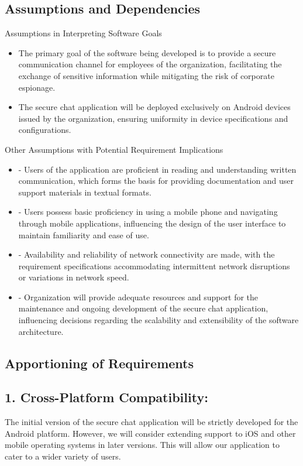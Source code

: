 \documentclass[]{article}
\begin{document}
\subsection{Assumptions and Dependencies}
\label{sub:assumptions_and_dependencies}
Assumptions in Interpreting Software Goals
\begin{itemize}
	\item The primary goal of the software being developed is to provide a secure communication channel for employees of the organization, facilitating the exchange of sensitive information while mitigating the risk of corporate espionage.
	\item The secure chat application will be deployed exclusively on Android devices issued by the organization, ensuring uniformity in device specifications and configurations.
\end{itemize}
Other Assumptions with Potential Requirement Implications
\begin{itemize}
	\item -	Users of the application are proficient in reading and understanding written communication, which forms the basis for providing documentation and user support materials in textual formats.
	\item -	Users possess basic proficiency in using a mobile phone and navigating through mobile applications, influencing the design of the user interface to maintain familiarity and ease of use.
	\item -	Availability and reliability of network connectivity are made, with the requirement specifications accommodating intermittent network disruptions or variations in network speed.
	\item -	Organization will provide adequate resources and support for the maintenance and ongoing development of the secure chat application, influencing decisions regarding the scalability and extensibility of the software architecture.
\end{itemize}

\subsection{Apportioning of Requirements}
\label{sub:apportioning_of_requirements}
\subsection*{1. Cross-Platform Compatibility:}
The initial version of the secure chat application will be strictly developed for the Android platform. However, we will consider extending support to iOS and other mobile operating systems in later versions. This will allow our application to cater to a wider variety of users.
\end{document}
